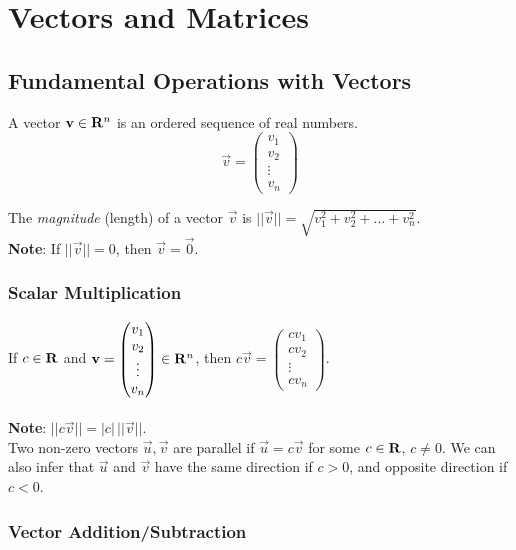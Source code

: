 \documentclass{article}
\begin{document}
\tableofcontents


\section{Vectors and Matrices}
\subsection{Fundamental Operations with Vectors}

	A vector $ \mathbf{v} \in \mathbf{R}^n $ is an ordered sequence of real numbers.
	\[
		\vec{v} = \begin{pmatrix} v_1 \\ v_2 \\ \vdots \\ v_n \end{pmatrix}
	\]
	
	The \textit{magnitude} (length) of a vector $ \vec{v} $ is $ ||\vec{v}|| = \sqrt{v_1^2 + v_2^2 + \dots + v_n^2} $. \\
	
	\textbf{Note}: If $ ||\vec{v}|| = 0 $, then $ \vec{v} = \vec{0} $.
	
	\subsubsection*{Scalar Multiplication}
	
	If $ c \in \mathbf{R} $ and $ \mathbf{v} = \begin{pmatrix} v_1 \\ v_2 \\ \vdots \\ v_n \end{pmatrix} \in \mathbf{R}^n $, then $ c\vec{v} = \begin{pmatrix} cv_1 \\ cv_2 \\ \vdots \\ cv_n \end{pmatrix} $. \\ \\
	
	\textbf{Note}: $ ||c\vec{v}|| = |c| \, ||\vec{v}|| $. \\
	
	Two non-zero vectors $ \vec{u}, \vec{v} $ are parallel if $ \vec{u} = c\vec{v} $ for some $ c \in \mathbf{R} $, $ c \neq 0 $. We can also infer that $ \vec{u} $ and $ \vec{v} $ have the same direction if $ c>0 $, and opposite direction if $ c<0 $.
	
	\subsubsection*{Vector Addition/Subtraction}
	
\end{document}
